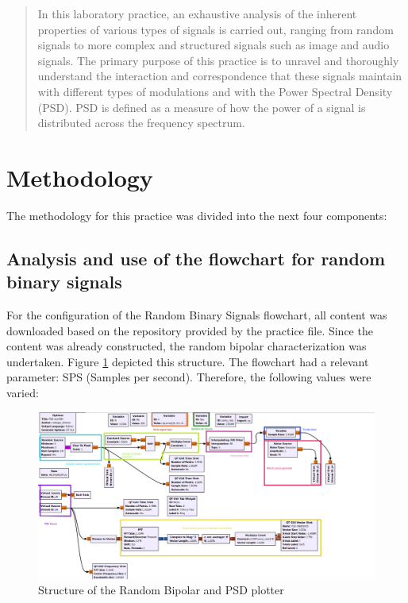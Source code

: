 \documentclass{journal}[IEEEtran, twocolumn]             %
\begin{document}
\begin{multicols}{2}

\begin{abstract}
In this laboratory practice, an exhaustive analysis of the inherent properties of various types of signals is carried out, ranging from random signals to more complex and structured signals such as image and audio signals. The primary purpose of this practice is to unravel and thoroughly understand the interaction and correspondence that these signals maintain with different types of modulations and with the Power Spectral Density (PSD). PSD is defined as a measure of how the power of a signal is distributed across the frequency spectrum.

\end{abstract}

\section{Methodology}

The methodology for this practice was divided into the next four components:

\subsection{Analysis and use of the flowchart for random binary signals}

For the configuration of the Random Binary Signals flowchart, all content was downloaded based on the repository provided by the practice file. Since the content was already constructed, the random bipolar characterization was undertaken. Figure \ref{fig:figA} depicted this structure. The flowchart had a relevant parameter: SPS (Samples per second). Therefore, the following values were varied:

\begin{figure}[H]
        \centering
            \includegraphics[width=0.65\columnwidth]{figs/Structure.jpg}
        \caption{\centering Structure of the Random Bipolar and PSD plotter}
        \label{fig:figA}
\end{figure}


\end{multicols}
\end{document}
